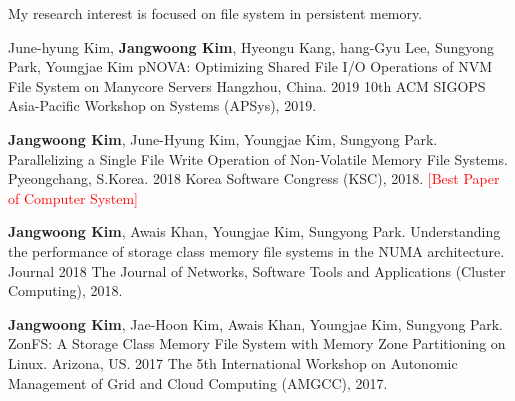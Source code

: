 

  My research interest is focused on file system in persistent memory.\\
\begin{cventries}


  \cventry
    {June-hyung Kim, \textbf{Jangwoong Kim}, Hyeongu Kang, hang-Gyu Lee, Sungyong Park, Youngjae Kim} %
    {pNOVA: Optimizing Shared File I/O Operations of NVM File System on Manycore Servers} %
    {Hangzhou, China.} %
    {2019} %
    {
      10th ACM SIGOPS Asia-Pacific Workshop on Systems (APSys), 2019.
    }

  \cventry
	{\textbf{Jangwoong Kim}, June-Hyung Kim, Youngjae Kim,  Sungyong Park.}
	{Parallelizing a Single File Write Operation of Non-Volatile Memory File Systems.}
	{Pyeongchang, S.Korea.}
	{2018}
	{
		Korea Software Congress (KSC), 2018. \textcolor{red}{[Best Paper of Computer System]}
	}

  \cventry
	{\textbf{Jangwoong Kim},  Awais Khan,  Youngjae Kim,  Sungyong Park.}
	{Understanding the performance of storage class memory file systems in the NUMA architecture.}
	{Journal}
	{2018}
	{
		The Journal of Networks, Software Tools and Applications (Cluster Computing), 2018.
	}

  \cventry
	{\textbf{Jangwoong Kim}, Jae-Hoon Kim,  Awais Khan,  Youngjae Kim,  Sungyong Park.}
	{ZonFS: A Storage Class Memory File System with Memory Zone Partitioning on Linux.}
	{Arizona, US.}
	{2017}
	{
		The 5th International Workshop on Autonomic Management of Grid and Cloud Computing (AMGCC), 2017.
	}


\end{cventries}

\clearpage

